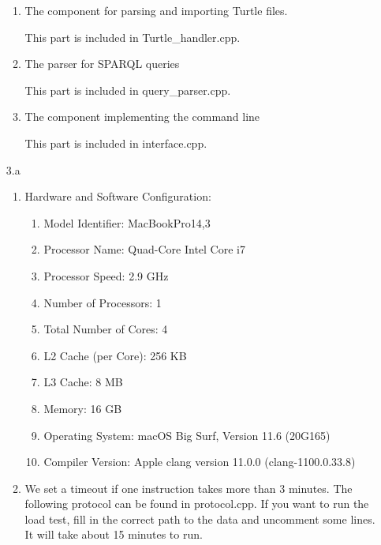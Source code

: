 \documentclass{article}
\begin{document}
\begin{enumerate}
\begin{enumerate}
\item The component for parsing and importing Turtle files.

This part is included in Turtle\_handler.cpp. 

\item The parser for SPARQL queries

This part is included in query\_parser.cpp. 

\item The component implementing the command line

This part is included in interface.cpp.

\end{enumerate}
\newpage
\item[3.a]
\begin{enumerate}
\item Hardware and Software Configuration:

\begin{enumerate}
\item Model Identifier:	MacBookPro14,3

\item Processor Name:	Quad-Core Intel Core i7

\item Processor Speed:	2.9 GHz

\item Number of Processors:	1

\item Total Number of Cores:	4

\item L2 Cache (per Core):	256 KB

\item L3 Cache:	8 MB

\item Memory:	16 GB

\item Operating System: macOS Big Surf, Version 11.6 (20G165)

\item Compiler Version: Apple clang version 11.0.0 (clang-1100.0.33.8)

\end{enumerate}

\item 

We set a timeout if one instruction takes more than 3 minutes. The following protocol can be found in protocol.cpp. If you want to run the load test, fill in the correct path to the data and uncomment some lines. It will take about 15 minutes to run. 


\end{enumerate}
\end{enumerate}
\end{document}
